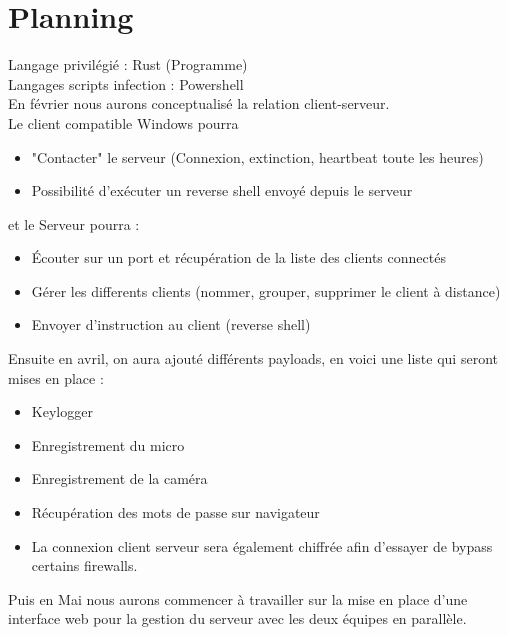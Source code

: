 \documentclass[a4paper]{article}
\begin{document}
   \section{Planning}
Langage privilégié : Rust (Programme)\\
Langages scripts infection : Powershell
\bigskip
\\
En février nous aurons conceptualisé la relation client-serveur.\\
Le client compatible Windows pourra
 \begin{itemize}
\item "Contacter" le serveur (Connexion, extinction, heartbeat toute les heures)
\item Possibilité d'exécuter un reverse shell envoyé depuis le serveur
\end{itemize}
et le Serveur pourra :
 \begin{itemize}
\item Écouter sur un port et récupération de la liste des clients connectés
\item Gérer les differents clients (nommer, grouper, supprimer le client à distance)
\item Envoyer d'instruction au client (reverse shell)
\end{itemize}
\bigskip
Ensuite en avril, on aura ajouté différents payloads, en voici une liste qui seront mises en place :
 \begin{itemize}
\item Keylogger
\item Enregistrement du micro
\item Enregistrement de la caméra
\item Récupération des mots de passe sur navigateur
\item La connexion client serveur sera également chiffrée afin d'essayer de bypass certains firewalls.
\end{itemize}


Puis en Mai nous aurons commencer à travailler sur la mise en place d'une interface web pour la gestion du serveur avec les deux équipes en parallèle.
\newpage
\end{document}
